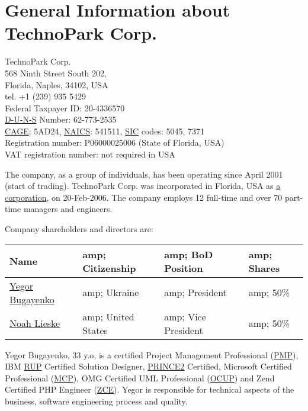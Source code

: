 
\section*{General Information about TechnoPark Corp.}

TechnoPark Corp.\\
568 Ninth Street South 202, \\
Florida, Naples, 34102, USA \\
tel. +1 (239) 935 5429 \\
Federal Taxpayer ID: 20-4336570 \\
\href{https://smallbusiness.dnb.com}{D-U-N-S} Number: 62-773-2535 \\
\href{http://www.dlis.dla.mil/cage_welcome.asp}{CAGE}: 5AD24, 
	\href{http://www.census.gov/eos/www/naics/}{NAICS}: 541511, 
	\href{http://www.osha.gov/pls/imis/sicsearch.html}{SIC} codes: 5045, 7371 \\
Registration number: P06000025006 (State of Florida, USA) \\
VAT registration number: not required in USA

The company, as a group of individuals, has been operating since April 2001 (start of trading). 
TechnoPark Corp. was incorporated in Florida, USA as 
\href{http://en.wikipedia.org/wiki/Corporation}{a corporation}, on 20-Feb-2006.
The company employs 12 full-time and over 70 part-time managers and engineers.

Company shareholders and directors are:

\begin{tabular}{llll}
Name &amp; 		Citizenship &amp; 	BoD Position &amp; 	Shares \\
\hline
\href{mailto:egor@technoparkcorp.com}{Yegor Bugayenko}	&amp; 	Ukraine &amp;		President &amp; 	50\% \\
\href{mailto:noah@technoparkcorp.com}{Noah Lieske} &amp;	United States &amp; 	Vice President &amp; 	50\% \\
\end{tabular}

Yegor Bugayenko, 33 y.o, is a certified 
Project Management Professional (\href{http://en.wikipedia.org/wiki/Project_Management_Professional}{PMP}), 
IBM \href{http://www-03.ibm.com/certify/certs/38008003.shtml}{RUP} Certified Solution Designer, 
\href{http://www.prince2.com/}{PRINCE2} Certified,
Microsoft Certified Professional (\href{http://www.microsoft.com/learning/mcp/mcp/}{MCP}), 
OMG Certified UML Professional (\href{http://www.omg.org/uml-certification/}{OCUP}) and 
Zend Certified PHP Engineer (\href{http://www.zend.com/en/services/certification/}{ZCE}).
Yegor is responsible for technical aspects of the business, software engineering process
and quality.


